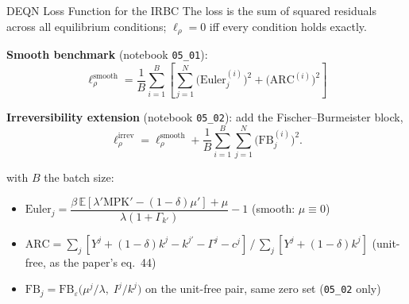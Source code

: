 \documentclass[aspectratio=169,11pt]{beamer}
\newcommand{\emphc}[1]{\textcolor{harvardcrimson}{#1}}
\newcommand{\E}[1]{\mathbb{E}\!\left[#1\right]}
\begin{document}
\begin{frame}{DEQN Loss Function for the IRBC}
\footnotesize
The loss is the \emphc{sum of squared residuals} across all equilibrium conditions; $\ell_\rho = 0$ iff every condition holds exactly.

\vspace{0.15em}
\textbf{Smooth benchmark} (notebook \texttt{05\_01}):
\[
\boxed{
\ell^{\mathrm{smooth}}_\rho = \frac{1}{B}\sum_{i=1}^{B} \left[\sum_{j=1}^{N} \bigl(\text{Euler}_j^{(i)}\bigr)^2 + \bigl(\text{ARC}^{(i)}\bigr)^2\right]
}
\]

\vspace{0.1em}
\textbf{Irreversibility extension} (notebook \texttt{05\_02}): add the Fischer--Burmeister block,
\[
\ell^{\mathrm{irrev}}_\rho = \ell^{\mathrm{smooth}}_\rho + \frac{1}{B}\sum_{i=1}^{B}\sum_{j=1}^{N}\bigl(\text{FB}_j^{(i)}\bigr)^2.
\]

\vspace{0.1em}
with $B$ the batch size:
\begin{itemize}\itemsep0pt
    \item $\text{Euler}_j = \dfrac{\beta\,\E{\lambda' \text{MPK}' - (1-\delta)\mu'} + \mu}{\lambda(1+\Gamma_{k'})} - 1$ \quad (smooth: $\mu \equiv 0$)
    \item $\text{ARC} = \sum_j [Y^j + (1-\delta)k^j - k^{j\prime} - \Gamma^j - c^j] \,\big/\, \sum_j [Y^j + (1-\delta)k^j]$ \quad (unit-free, as the paper's eq.\ 44)
    \item $\text{FB}_j = \text{FB}_\varepsilon\bigl(\mu^j/\lambda,\; I^j/k^j\bigr)$ on the unit-free pair, same zero set \quad (\texttt{05\_02} only)
\end{itemize}
\end{frame}
\end{document}
